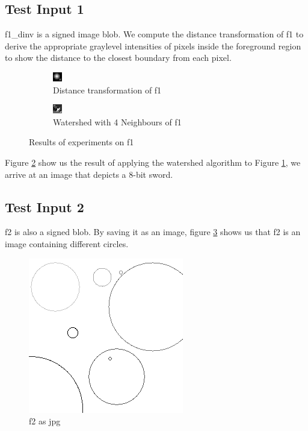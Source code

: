 \documentclass{article}
\begin{document}
\subsection{Test Input 1}
f1\_dinv is a signed image blob. We compute the distance transformation of f1 to derive the appropriate graylevel intensities of pixels inside the foreground region to show the distance to the closest boundary from each pixel.
\begin{figure}[ht]
\centering
\begin{subfigure}{.5\textwidth}
  \centering
  \includegraphics[scale=10]{experiments/f1_f2/f1_distanced.png}
  \caption{Distance transformation of f1}
  \label{fig:f1_1}
\end{subfigure}%
\begin{subfigure}{.5\textwidth}
  \centering
  \includegraphics[scale=10]{experiments/f1_f2/4_f1_segmented.png}
  \caption{Watershed with 4 Neighbours of f1}
  \label{fig:f1_2}
\end{subfigure}
\caption{Results of experiments on f1}
\label{fig:f1}
\end{figure}
\begin{flushleft}
Figure \ref{fig:f1_2} show us the result of applying the watershed algorithm to Figure \ref{fig:f1_1}, we arrive at an image that depicts a 8-bit sword. 
\end{flushleft}

\subsection{Test Input 2}
f2 is also a signed blob. By saving it as an image, figure \ref{fig:f1} shows us that f2 is an image containing different circles.
\begin{figure}[ht]
    \centering
    \includegraphics[scale=.5]{experiments/f1_f2/f2.png}
    \caption{f2 as jpg}
    \label{fig:f2}
\end{figure}
\end{document}
